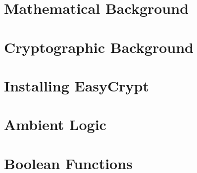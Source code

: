 \documentclass[12pt,openany]{book}
\begin{document}
	
	
	\tableofcontents
	\newpage
	
	
	\newpage
	\chapter{Mathematical Background}
	
	
	\newpage
	\chapter{Cryptographic Background}
	
	
	\newpage
	\chapter{Installing EasyCrypt}
	
	
	\newpage
	\chapter{Ambient Logic}
	
		
	\newpage
	\appendix
	\chapter{Boolean Functions}
%	
	
	
		
\end{document}
